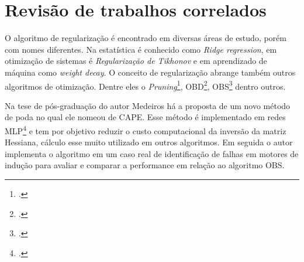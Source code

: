 \section{Revisão de trabalhos correlados}

O algoritmo de regularização é encontrado em diversas áreas de estudo, porém com nomes diferentes. Na estatística é conhecido como \emph{Ridge regression}, em otimização de sistemas é \emph{Regularização de Tikhonov} e em aprendizado de máquina como \emph{weight decay}.
O conceito de regularização abrange também outros algoritmos de otimização. Dentre eles o \emph{Pruning}\footcite{Pruning (poda) algoritmo muito utilizado em Arvore de decisao}, OBD\footcite{OBD: Optimal Brain Damage}, OBS\footcite{OBS: Optimal Brain Surgeon} dentro outros.

Na tese de pós-graduação do autor Medeiros\cite*{OBDCAPES} há a proposta de um novo método de poda no qual ele nomeou de CAPE. Esse método é implementado em redes MLP\footcite{MLP: Multilayer Percepetron}
e tem por objetivo reduzir o custo computacional da inversão da matriz Hessiana, cálculo esse muito utilizado em outros algoritmos. Em seguida o autor implementa o algoritmo em um caso real de identificação de falhas em motores de indução para avaliar e comparar a performance em relação ao algoritmo OBS.






